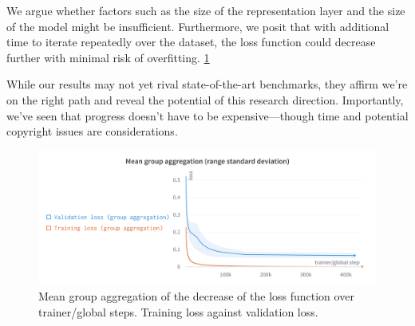 We argue whether factors such as the size of the representation layer and the size of the model \cite{verydeep} might be insufficient. Furthermore, we posit that with additional time to iterate repeatedly over the dataset, the loss function could decrease further with minimal risk of overfitting. \ref{fig:lossf}

While our results may not yet rival state-of-the-art benchmarks, they affirm we're on the right path and reveal the potential of this research direction. Importantly, we've seen that progress doesn't have to be expensive—though time and potential copyright issues are considerations.

\begin{figure}[h]
    \centering
    \includegraphics[width=\textwidth]{figures/images/Mean group aggregation.png}
    \caption[Loss function performance plot]{Mean group aggregation of the decrease of the loss function over trainer/global steps. Training loss against validation loss.}
    \label{fig:lossf}
\end{figure}



\newpage


